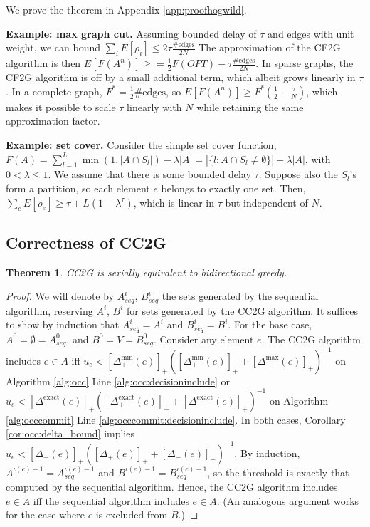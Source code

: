 \documentclass{article} %
\newcommand{\hogwild}{CF2G}
\newcommand{\occ}{CC2G}
\newtheorem{thm}{Theorem}[section]
\begin{document}
We prove the theorem in Appendix \ref{app:proofhogwild}.



\textbf{Example: max graph cut.}
Assuming bounded delay of $\tau$ and edges with unit weight, we can bound $\sum_i E[\rho_i] \leq 2\tau\frac{\text{\#edges}}{2N}$
The approximation of the \hogwild{} algorithm is then $E[F(A^n)] \geq = \frac{1}{2} F(OPT) - \tau\frac{\#\text{edges}}{2N}$.
In sparse graphs, the \hogwild{} algorithm is off by a small additional term, which albeit grows linearly in $\tau$.
In a complete graph, $F^* = \frac{1}{2}\#\text{edges}$, so $E[F(A^n)] \geq F^*\left(\frac{1}{2} - \frac{\tau}{N}\right)$, which makes it possible to scale $\tau$ linearly with $N$ while retaining the same approximation factor.


\textbf{Example: set cover.}
Consider the simple set cover function,
$F(A) = \sum_{l=1}^L \min(1,|A\cap S_l|) - \lambda|A| = |\{l: A\cap S_l \neq\emptyset\}| - \lambda|A|$,
with $0 < \lambda \leq 1$.
We assume that there is some bounded delay $\tau$.
Suppose also the $S_l$'s form a partition, so each element $e$ belongs to exactly one set.
Then, $\sum_e E[\rho_e] \geq \tau + L(1-\lambda^\tau)$, which is linear in $\tau$ but independent of $N$.



\subsection{Correctness of \occ{}}
\begin{thm} \occ{} is serially equivalent to bidirectional greedy.
\end{thm}
\begin{proof}
We will denote by $A_{seq}^i$, $B_{seq}^i$ the sets generated by the sequential algorithm, reserving $A^i$, $B^i$ for sets generated by the \occ{} algorithm.
It suffices to show by induction that $A_{seq}^i = A^i$ and $B_{seq}^i = B^i$.
For the base case, $A^0 = \emptyset = A_{seq}^0$, and $B^0 = V = B_{seq}^0$.
Consider any element $e$.
The \occ{} algorithm includes $e \in A$ iff $u_e < [\Delta_+^{\min}(e)]_+ ([\Delta_+^{\min}(e)]_+ + [\Delta_-^{\max}(e)]_+)^{-1}$ on Algorithm \ref{alg:occ} Line \ref{alg:occ:decisioninclude} or $u_e < [\Delta_+^{\text{exact}}(e)]_+ ([\Delta_+^{\text{exact}}(e)]_+ + [\Delta_-^{\text{exact}}(e)]_+)^{-1}$ on Algorithm \ref{alg:occcommit} Line \ref{alg:occcommit:decisioninclude}.
In both cases, Corollary \ref{cor:occ:delta_bound} implies $u_e < [\Delta_+(e)]_+ ([\Delta_+(e)]_+ + [\Delta_-(e)]_+)^{-1}$.
By induction, $A^{\iota(e)-1} = A_{seq}^{\iota(e)-1}$ and $B^{\iota(e)-1} = B_{seq}^{\iota(e)-1}$, so the threshold is exactly that computed by the sequential algorithm.
Hence, the \occ{} algorithm includes $e \in A$ iff the sequential algorithm includes $e \in A$.
(An analogous argument works for the case where $e$ is excluded from $B$.)

\end{proof}
\end{document}
